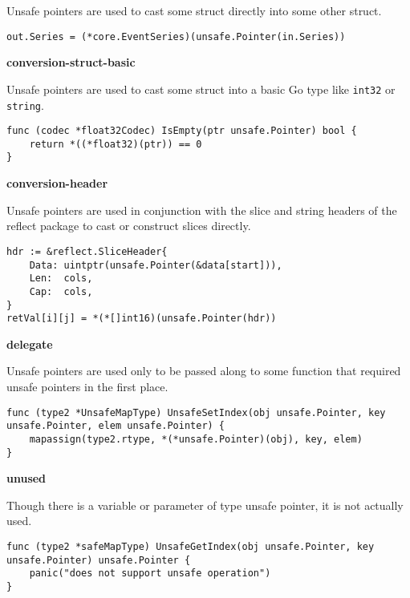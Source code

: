 Unsafe pointers are used to cast some struct directly into some other struct.

\begin{lstlisting}[language=Golang, label=lst:survey-small-classexample-conversion-struct-struct, caption=Usage class example: conversion-struct-struct]
out.Series = (*core.EventSeries)(unsafe.Pointer(in.Series))
\end{lstlisting}


\textbf{conversion-struct-basic}

Unsafe pointers are used to cast some struct into a basic Go type like \texttt{int32} or \texttt{string}.

\begin{lstlisting}[language=Golang, label=lst:survey-small-classexample-conversion-struct-basic, caption=Usage class example: conversion-struct-basic]
func (codec *float32Codec) IsEmpty(ptr unsafe.Pointer) bool {
    return *((*float32)(ptr)) == 0
}
\end{lstlisting}


\textbf{conversion-header}

Unsafe pointers are used in conjunction with the slice and string headers of the reflect package to cast or construct
slices directly.

\begin{lstlisting}[language=Golang, label=lst:survey-small-classexample-conversion-header, caption=Usage class example: conversion-header]
hdr := &reflect.SliceHeader{
    Data: uintptr(unsafe.Pointer(&data[start])),
    Len:  cols,
    Cap:  cols,
}
retVal[i][j] = *(*[]int16)(unsafe.Pointer(hdr))
\end{lstlisting}


\textbf{delegate}

Unsafe pointers are used only to be passed along to some function that required unsafe pointers in the first place.

\begin{lstlisting}[language=Golang, label=lst:survey-small-classexample-delegate, caption=Usage class example: delegate]
func (type2 *UnsafeMapType) UnsafeSetIndex(obj unsafe.Pointer, key unsafe.Pointer, elem unsafe.Pointer) {
    mapassign(type2.rtype, *(*unsafe.Pointer)(obj), key, elem)
}
\end{lstlisting}


\textbf{unused}

Though there is a variable or parameter of type unsafe pointer, it is not actually used.

\begin{lstlisting}[language=Golang, label=lst:survey-small-classexample-unused, caption=Usage class example: unused]
func (type2 *safeMapType) UnsafeGetIndex(obj unsafe.Pointer, key unsafe.Pointer) unsafe.Pointer {
    panic("does not support unsafe operation")
}
\end{lstlisting}


